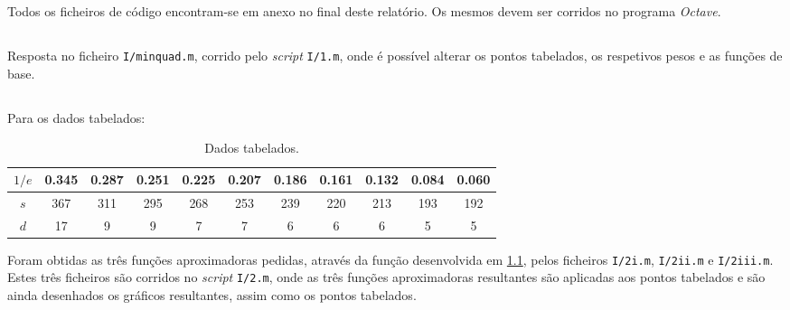 \documentclass[portuguese, a4paper]{article}
\newcommand\tu[0]{\textunderscore}
\begin{document}


\renewcommand{\thesection}{\Roman{section}}
\renewcommand{\thesubsection}{\arabic{subsection}.}
\renewcommand{\thesubsubsection}{\alph{subsubsection})}

\renewcommand{\contentsname}{Índice}
\tableofcontents
\newpage

\section{} \label{sec:I}
	\par
	Todos os ficheiros de código encontram-se em anexo no final deste relatório. Os mesmos devem ser corridos no programa \emph{Octave}.

	\subsection{} \label{sec:I.1}
	\par
	Resposta no ficheiro \texttt{I/min\tu quad.m}, corrido pelo \emph{script} \texttt{I/1.m}, onde é possível alterar os pontos tabelados, os respetivos pesos e as funções de base.

	\subsection{} \label{sec:I.2}
	\par
	Para os dados tabelados:
	\begin{table}[H]
		\centering
		\begin{tabular}{c|c|c|c|c|c|c|c|c|c|c}
			\hline
			$1/e$	& 0.345	& 0.287	& 0.251	& 0.225	& 0.207	& 0.186	& 0.161	& 0.132	& 0.084	& 0.060	\\ \hline
			$s$		& 367	& 311	& 295	& 268	& 253	& 239	& 220	& 213	& 193	& 192	\\ \hline
			$d$		& 17	& 9		& 9		& 7		& 7		& 6		& 6		& 6		& 5		& 5		\\ \hline
		\end{tabular}
		\caption{Dados tabelados.}
	\end{table}

	\par
	Foram obtidas as três funções aproximadoras pedidas, através da função desenvolvida em \ref{sec:I.1}, pelos ficheiros \texttt{I/2\tu i.m}, \texttt{I/2\tu ii.m} e \texttt{I/2\tu iii.m}. Estes três ficheiros são corridos no \emph{script} \texttt{I/2.m}, onde as três funções aproximadoras resultantes são aplicadas aos pontos tabelados e são ainda desenhados os gráficos resultantes, assim como os pontos tabelados.
\end{document}
